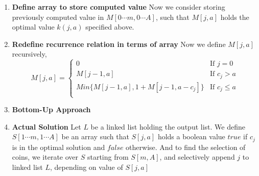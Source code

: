 \documentclass[11pt]{article}
\begin{document}
\begin{enumerate}
\begin{enumerate}
    \item \textbf{Define array to store computed value} Now we consider storing previously computed value in $M[0\cdots m, 0\cdots A]$, such that $M[j, a]$ holds the optimal value $k(j, a)$ specified above.

    \item \textbf{Redefine recurrence relation in terms of array} Now we define $M[j, a]$ recursively,
    \[
      M[j, a] =
      \begin{cases}
        0 & \text{If } j = 0 \\
        M[j-1, a] & \text{If } c_j > a\\
        Min\{ M[j-1, a],1 + M[j-1, a-c_j]\} & \text{If } c_j \leq a\\
      \end{cases}
    \]
    \item \textbf{Bottom-Up Approach}
    $ $\\
    \begin{algorithm}[H]

     \end{algorithm}
     \item \textbf{Actual Solution}
     Let $L$ be a linked list holding the output list. We define $S[1\cdots m, 1\cdots A]$ be an array such that $S[j, a]$ holds a boolean value $true$ if $c_j$ is in the optimal solution and $false$ otherwise. And to find the selection of coins, we iterate over $S$ starting from $S[m, A]$, and selectively append $j$ to linked list $L$, depending on value of $S[j, a]$

     \begin{algorithm}[H]



\end{algorithm}
\end{enumerate}
\end{enumerate}
\end{document}
